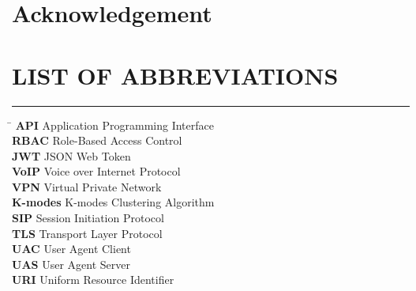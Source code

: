 \documentclass[12pt]{article}
\begin{document}


\renewcommand{\listfigurename}{LIST OF FIGURES}
\renewcommand{\cftloftitlefont}{\Large\bfseries} 
\renewcommand{\cftafterloftitle}{
    \par\noindent\vspace{-0.5em}
    \textcolor{blue}{\rule{\textwidth}{0.5pt}}
    \vspace{1em} 
}
\renewcommand{\cftfigpresnum}{Figure~}
\renewcommand{\cftfigaftersnum}{:}
\setlength{\cftfignumwidth}{5em}


\renewcommand{\contentsname}{\centering TABLE OF CONTENTS}
\begin{center}
    \tableofcontents
\end{center}
\newpage

\section*{Acknowledgement}


\newpage
\vspace{2em}
\section*{LIST OF ABBREVIATIONS}
\vspace{-0.9em}
\textcolor{blue}{\rule{\textwidth}{0.5pt}} 
\vspace{1em}
\begin{tabbing}
    \hspace{4cm} \= \hspace{10cm} \kill
    \textbf{API} \> Application Programming Interface \\
    \textbf{RBAC} \> Role-Based Access Control \\
    \textbf{JWT} \> JSON Web Token \\
    \textbf{VoIP} \> Voice over Internet Protocol \\
    \textbf{VPN} \> Virtual Private Network \\
    \textbf{K-modes} \> K-modes Clustering Algorithm \\
    \textbf{SIP} \> Session Initiation Protocol \\
    \textbf{TLS} \> Transport Layer Protocol \\
    \textbf{UAC} \> User Agent Client \\
    \textbf{UAS} \> User Agent Server \\
    \textbf{URI} \> Uniform Resource Identifier \\
\end{tabbing}
\end{document}
